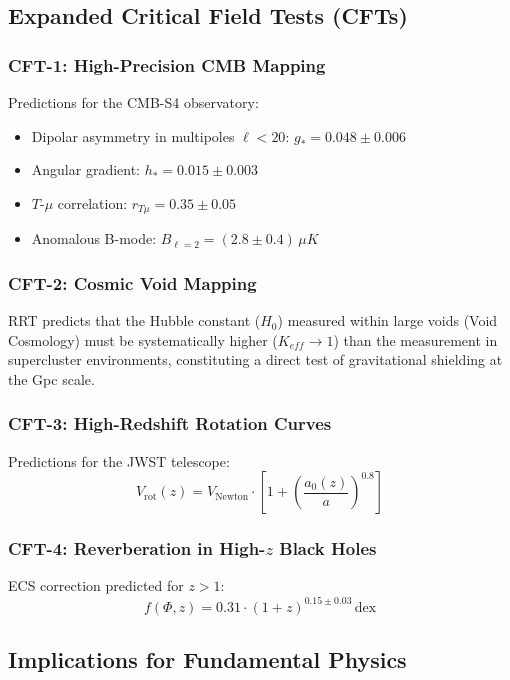 \documentclass[12pt,a4paper]{article}
\begin{document}
\subsection{Expanded Critical Field Tests (CFTs)}

\subsubsection{CFT-1: High-Precision CMB Mapping}
Predictions for the CMB-S4 observatory:
\begin{itemize}
    \item Dipolar asymmetry in multipoles $\ell<20$: $g_* = 0.048 \pm 0.006$
    \item Angular gradient: $h_* = 0.015 \pm 0.003$
    \item $T$-$\mu$ correlation: $r_{T\mu} = 0.35 \pm 0.05$
    \item Anomalous B-mode: $B_{\ell=2} = (2.8 \pm 0.4) \, \mu K$
\end{itemize}

\subsubsection{CFT-2: Cosmic Void Mapping}
RRT predicts that the Hubble constant ($H_0$) measured within large voids (Void Cosmology) must be systematically higher ($K_{eff} \to 1$) than the measurement in supercluster environments, constituting a direct test of gravitational shielding at the Gpc scale.

\subsubsection{CFT-3: High-Redshift Rotation Curves}
Predictions for the JWST telescope:
\begin{equation}
    V_{\text{rot}}(z) = V_{\text{Newton}} \cdot \left[ 1 + \left( \frac{a_0(z)}{a} \right)^{0.8} \right]
\end{equation}

\subsubsection{CFT-4: Reverberation in High-\texorpdfstring{$z$}{z} Black Holes}
ECS correction predicted for $z>1$:
\begin{equation}
    f(\Phi, z) = 0.31 \cdot (1+z)^{0.15 \pm 0.03} \, \text{dex}
\end{equation}

\subsection{Implications for Fundamental Physics}
\end{document}
